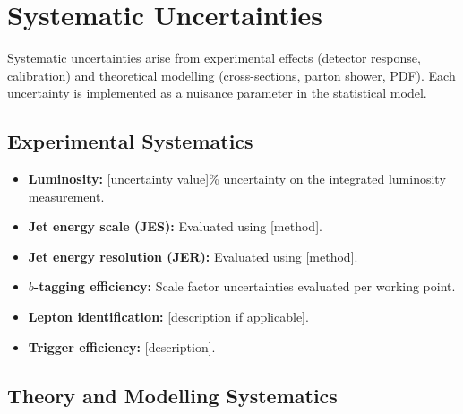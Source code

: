 
\section{Systematic Uncertainties}
\label{sec:systematics}


Systematic uncertainties arise from experimental effects (detector response,
calibration) and theoretical modelling (cross-sections, parton shower,
PDF). Each uncertainty is implemented as a nuisance parameter in the
statistical model.

\subsection{Experimental Systematics}
\label{sec:systematics:experimental}


\begin{itemize}
  \item \textbf{Luminosity:} [uncertainty value]\% uncertainty on the
        integrated luminosity measurement.
  \item \textbf{Jet energy scale (JES):} Evaluated using [method].
  \item \textbf{Jet energy resolution (JER):} Evaluated using [method].
  \item \textbf{$b$-tagging efficiency:} Scale factor uncertainties evaluated
        per working point.
  \item \textbf{Lepton identification:} [description if applicable].
  \item \textbf{Trigger efficiency:} [description].
\end{itemize}

\subsection{Theory and Modelling Systematics}
\label{sec:systematics:theory}


